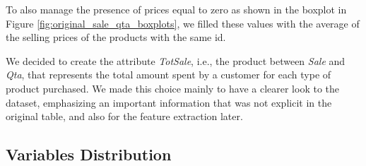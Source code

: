 To also manage the presence of prices equal to zero as shown in the boxplot in Figure \ref{fig:original_sale_qta_boxplots}, we filled these values with the average of the selling prices of the products with the same id.

We decided to create the attribute \emph{TotSale}, i.e., the product between \emph{Sale} and \emph{Qta}, that represents the total amount spent by a customer for each type of product purchased. We made this choice mainly to have a clearer look to the dataset, emphasizing an important information that was not explicit in the original table, and also for the feature extraction later.

\subsection{Variables Distribution}

